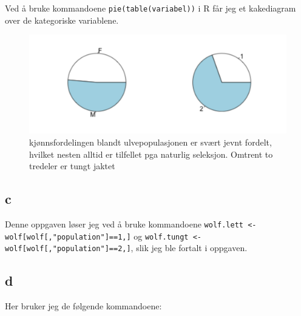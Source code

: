 Ved å bruke kommandoene \texttt{pie(table(variabel))} i R får jeg et kakediagram over de kategoriske variablene. 

\begin{figure}[H]
		\centering
		\includegraphics[width=0.7\linewidth]{wolf_sex.png}
		\caption{kjønnsfordelingen blandt ulvepopulasjonen er svært jevnt fordelt, hvilket nesten alltid er tilfellet pga naturlig seleksjon. Omtrent to tredeler er tungt jaktet}
		\label{fig:sex_population}
\end{figure}

\subsection*{c}

Denne oppgaven løser jeg ved å bruke kommandoene \texttt{wolf.lett <- wolf[wolf[,"population"]==1,]} og \texttt{wolf.tungt <- wolf[wolf[,"population"]==2,]}, slik jeg ble fortalt i oppgaven.

\subsection*{d}
Her bruker jeg de følgende kommandoene:

